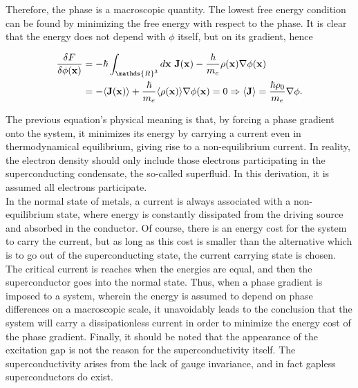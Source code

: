 Therefore, the phase is a macroscopic quantity. The lowest free energy condition can be found by minimizing the free energy with respect to the phase. It is clear that the energy does not depend with $\phi$ itself, but on its gradient, hence

\begin{equation}
\begin{split}
    \frac{\delta F}{\delta \phi({\bf x})} &= - \hbar \int_{\mathds{R}^3} d{\bf x} \blanky {\bf J}({\bf x}) - \frac{\hbar}{m_e} \rho({\bf x}) \nabla \phi({\bf x}) \\
    &= - \langle {\bf J}({\bf x}) \rangle + \frac{\hbar}{m_e} \langle \rho({\bf x}) \rangle \nabla \phi({\bf x}) = 0   \Rightarrow \langle {\bf J} \rangle = \frac{\hbar \rho_0}{m_e} \nabla \phi.
\end{split}
\end{equation}

\begin{tcolorbox}[colback = yellow, title = Physical Context]

The previous equation's physical meaning is that, by forcing a phase gradient onto the system, it minimizes its energy by carrying a current even in thermodynamical equilibrium, giving rise to a non-equilibrium current. In reality, the electron density should only include those electrons participating in the superconducting condensate, the so-called superfluid. In this derivation, it is assumed all electrons participate. \\

In the normal state of metals, a current is always associated with a non-equilibrium state, where energy is constantly dissipated from the driving source and absorbed in the conductor. Of course, there is an energy cost for the system to carry the current, but as long as this cost is smaller than the alternative which is to go out of the superconducting state, the current carrying state is chosen. The critical current is reaches when the energies are equal, and then the superconductor goes into the normal state. Thus, when a phase gradient is imposed to a system, wherein the energy is assumed to depend on phase differences on a macroscopic scale, it unavoidably leads to the conclusion that the system will carry a dissipationless current in order to minimize the energy cost of the phase gradient. Finally, it should be noted that the appearance of the excitation gap is not the reason for the superconductivity itself. The superconductivity arises from the lack of gauge invariance, and in fact gapless superconductors do exist. \\

\end{tcolorbox}

